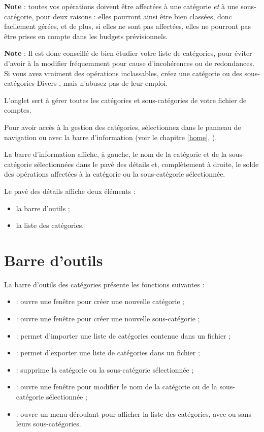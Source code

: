 \textbf{Note} : toutes vos opérations doivent être affectées à une catégorie \emph{et} à une sous-catégorie, pour deux raisons : elles pourront ainsi être bien classées, donc facilement gérées, et de plus, si elles ne sont pas affectées, elles ne pourront pas être prises en compte dans les budgets prévisionnels.

\textbf{Note} : Il est donc conseillé de bien étudier votre liste de catégories, pour éviter d'avoir à la modifier fréquemment pour cause d'incohérences ou de redondances. Si vous avez vraiment des opérations inclassables, créez une catégorie ou des sous-catégories \og Divers \fg{}, mais n'abusez pas de leur emploi.

L'onglet  sert à gérer  toutes les catégories et sous-catégories de votre fichier de comptes.

Pour avoir accès à la gestion des catégories, sélectionnez  dans le panneau de navigation ou avec la barre d'information (voir le chapitre \vref{home}, ).

La barre d'information affiche, à gauche, le nom de la catégorie et de la sous-catégorie sélectionnées dans le pavé des détails et, complètement à droite, le solde des opérations affectées à la catégorie ou la sous-catégorie sélectionnée.

Le pavé des détails affiche deux éléments :
\begin{itemize}
	 \item la barre d'outils ;
	 \item la liste des catégories.
\end{itemize}


\section{Barre d'outils\label{categories-functions}}


La barre d'outils des catégories présente les fonctions suivantes  :

\begin{itemize}
	 \item {} : ouvre une fenêtre pour créer une nouvelle catégorie ;
	 \item {} : ouvre une fenêtre pour créer une 	nouvelle sous-catégorie ;
	 \item {} : permet d'importer une liste de catégories contenue dans un fichier ;
	 \item {} : permet d'exporter une liste de catégories dans un fichier ;
	 \item {} : supprime la catégorie ou la sous-catégorie sélectionnée ;
	 \item {} : ouvre une fenêtre pour modifier le nom de la catégorie ou de la sous-catégorie sélectionnée ;
	 \item {} : ouvre un menu déroulant pour afficher la liste des catégories, avec ou sans leurs sous-catégories.
\end{itemize}

